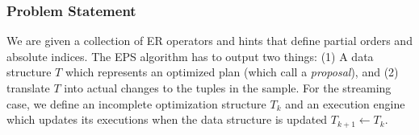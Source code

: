 \subsubsection{Problem Statement}
We are given a collection of ER operators and hints that define partial orders and absolute indices.
The EPS algorithm has to output two things: (1) A data structure $T$ which represents an optimized plan (which call a \emph{proposal}), and
(2) translate $T$ into actual changes to the tuples in the sample.
For the streaming case, we define an incomplete optimization structure $T_k$ and an execution engine which updates its executions when the data
structure is updated $T_{k+1}\leftarrow T_k$. 












